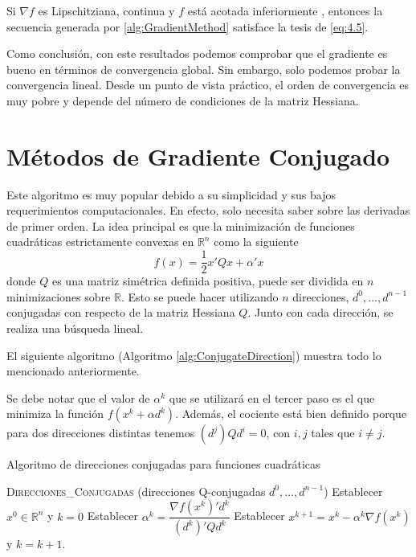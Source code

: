 \begin{proposicion}
Si $\nabla f$ es Lipschitziana, continua y $f$ está acotada inferiormente , entonces la secuencia generada por \ref{alg:GradientMethod} satisface la tesis de \ref{eq:4.5}.
\end{proposicion}

Como conclusión, con este resultados podemos comprobar que el gradiente es bueno en términos de convergencia global. 
Sin embargo, solo podemos probar la convergencia lineal. 
Desde un punto de vista práctico, el orden de convergencia es muy pobre y depende del número de condiciones de la matriz Hessiana.

\section{Métodos de Gradiente Conjugado}

Este algoritmo es muy popular debido a su simplicidad y sus bajos requerimientos computacionales. 
En efecto, solo necesita saber sobre las derivadas de primer orden. 
La idea principal es que la minimización de funciones cuadráticas estrictamente convexas en $\mathbb{R}^n$ como la siguiente
\begin{equation}
f(x) = \dfrac{1}{2}x'Qx+\alpha'x
\label{eq:4.17}
\end{equation}
donde $Q$ es una matriz simétrica definida positiva, puede ser dividida en $n$ minimizaciones sobre $\mathbb{R}$. 
Esto se puede hacer utilizando $n$ direcciones, $d^0,...,d^{n-1}$ conjugadas con respecto de la matriz Hessiana $Q$. 
Junto con cada dirección, se realiza una búsqueda lineal.

El siguiente algoritmo (Algoritmo \ref{alg:ConjugateDirection}) muestra todo lo mencionado anteriormente.

Se debe notar que el valor de $\alpha^k$ que se utilizará en el tercer paso es el que minimiza la función $f(x^k + \alpha d^k)$. 
Además, el cociente está bien definido porque para dos direcciones distintas tenemos $(d^j)Qd^i=0$, con $i,j$ tales que $i\neq j$.

\begin{algorithm}
\caption{Algoritmo de direcciones conjugadas para funciones cuadráticas}\label{alg:ConjugateDirection}
\begin{algorithmic}[1]
\Procedure \textsc{Direcciones\_Conjugadas} (direcciones Q-conjugadas $d^0,...,d^{n-1}$)
\State Establecer $x^0\in\mathbb{R}^n$ y $k=0$
	\State Establecer $\alpha^k = \dfrac{\nabla f(x^k)'d^k}{(d^k)'Qd^k}$
	\State Establecer $x^{k+1} = x^k - \alpha^k\nabla f(x^k)$ y $k=k+1$.
\EndWhile
\EndProcedure
\end{algorithmic}
\end{algorithm}

